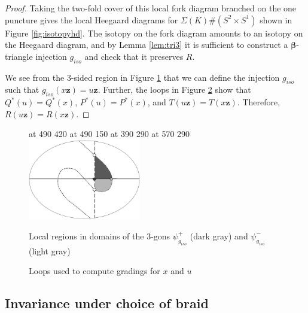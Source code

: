 \documentclass[11pt]{article}
\theoremstyle{plain} \newtheorem{thm}{Theorem}[subsection]
\theoremstyle{plain} \newtheorem{cor}[thm]{Corollary}
\theoremstyle{plain} \newtheorem{prop}[thm]{Proposition}
\theoremstyle{plain} \newtheorem{conj}[thm]{Conjecture}
\theoremstyle{plain} \newtheorem{lem}[thm]{Lemma}
\theoremstyle{definition} \newtheorem{df}[thm]{Definition}
\theoremstyle{remark} \newtheorem{rmk}[thm]{Remark}
\theoremstyle{remark} \newtheorem{obs}[thm]{Observation}
\newcommand{\DBCs}[1]{\Sigma(#1)\#(S^{2}\times S^{1})}
\newcommand{\bb}{\boldsymbol{\beta}}
\newcommand{\bz}{\mathbf{z}}
\begin{document}
\begin{proof}
Taking the two-fold cover of this local fork diagram branched on the one puncture gives the local Heegaard diagrams for $\DBCs{K}$ shown in Figure \ref{fig:isotopyhd}.  The isotopy on the fork diagram amounts to an isotopy on the Heegaard diagram, and by Lemma \ref{lem:tri3} it is sufficient to construct a $\bb$-triangle injection $g_{iso}$ and check that it preserves $R$.

We see from the 3-sided region in Figure \ref{fig:isotopytri} that we can define the injection $g_{iso}$ such that $g_{iso}(x\bz) = u\bz$.  Further, the loops in Figure \ref{fig:isotopyloops} show that $Q^{*}(u) = Q^{*}(x)$, $ P^{*}(u) =  P^{*}(x)$, and $T(u\bz) = T(x\bz)$.  Therefore, $R(u\bz) = R(x\bz)$.
\end{proof}

\begin{figure}[h]
\centering
\begin{minipage}[c]{.35\linewidth}
\small
\pinlabel* {$\theta_{\bb \bb'}$} at 490 420
\pinlabel* {$\theta_{\bb' \bb}$} at 490 150
 at 390 290
 at 570 290
\endlabellist
\includegraphics[height = 35mm]{MoveIsoTri} \end{minipage}
\begin{minipage}[c]{.63\linewidth}
\caption[Local components of 3-gon domains associated to isotopy]{Local regions in domains of the 3-gons $\psi^{+}_{g_{iso}}$ (dark gray) and $\psi^{-}_{g_{iso}}$ (light gray)}
\label{fig:isotopytri}
\end{minipage}
\end{figure}

\begin{figure}[h]
\centering
{}\qquad
{}
\caption[Grading loops associated to isotopy]{Loops used to compute gradings for $x$ and $u$ \label{fig:isotopyloops}}
\end{figure}

\subsection{Invariance under choice of braid}\label{sec:Rmoves}
\end{document}
